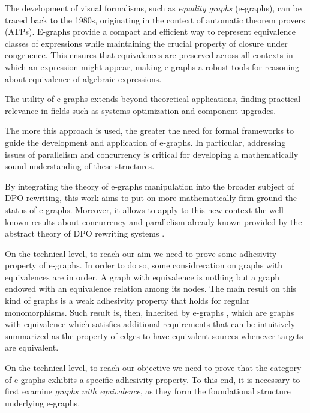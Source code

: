 The development of visual formalisms, such as \emph{equality graphs} (e-graphs), can be traced back to the 1980s, originating in the context of automatic theorem provers (ATPs). E-graphs provide a compact and efficient way to represent equivalence classes of expressions while maintaining the crucial property of closure under congruence. This ensures that equivalences are preserved across all contexts in which an expression might appear, making e-graphs a robust tools for reasoning about equivalence of algebraic expressions.

The utility of e-graphs extends beyond theoretical applications, finding practical relevance in fields such as systems optimization and component upgrades.

The more this approach is used, the greater the need for formal frameworks to guide the development and application of e-graphs. In particular, addressing issues of parallelism and concurrency is critical for developing a mathematically sound understanding of these structures.


 By integrating the theory of e-graphs manipulation into the broader subject of DPO rewriting, this work aims to put on more mathematically firm ground the status of e-graphs. Moreover, it allows to apply to this new context the well known results about concurrency and parallelism already known provided by the abstract theory of DPO rewriting systems \cite{baldan1999concurrent,ehrig1999handbook}. 
 
 On the technical level, to reach our aim we need to prove some adhesivity property of e-graphs. 
 In order to do so, some considreration on graphs with equivalences are in order. 
 A graph with equivalence is nothing but a graph endowed with an equivalence relation among its nodes. 
 The main result on this kind of graphs is a weak adhesivity property that holds for regular monomorphisms. 
 Such result is, then, inherited by e-graphs , which are graphs with equivalence which satisfies additional requirements that can be intuitively summarized as the property of edges to have equivalent sources whenever targets are equivalent.


On the technical level, to reach our objective we need to prove that the category of e-graphs exhibits a specific adhesivity property. To this end, it is necessary to first examine \emph{graphs with equivalence}, as they form the foundational structure underlying e-graphs.

